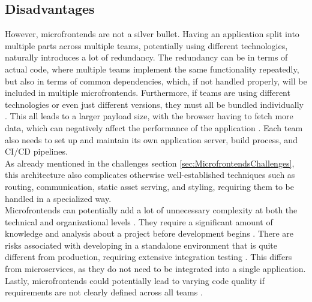 \subsection{Disadvantages}
However, microfrontends are not a silver bullet. Having an application split into multiple parts across multiple teams, potentially using different technologies, naturally introduces a lot of redundancy. The redundancy can be in terms of actual code, where multiple teams implement the same functionality repeatedly, but also in terms of common dependencies, which, if not handled properly, will be included in multiple microfrontends. Furthermore, if teams are using different technologies or even just different versions, they must all be bundled individually \cite{Geers}\cite{Peltonen}. This all leads to a larger payload size, with the browser having to fetch more data, which can negatively affect the performance of the application \cite{Peltonen}\cite{Montelius}\cite{Jackson}. Each team also needs to set up and maintain its own application server, build process, and CI/CD pipelines. \\

\noindent
As already mentioned in the challenges section \ref{sec:MicrofrontendsChallenges}, this architecture also complicates otherwise well-established techniques such as routing, communication, static asset serving, and styling, requiring them to be handled in a specialized way. \\

\noindent
Microfrontends can potentially add a lot of unnecessary complexity at both the technical and organizational levels \cite{Peltonen}. They require a significant amount of knowledge and analysis about a project before development begins \cite{Montelius}\cite{Peltonen}. There are risks associated with developing in a standalone environment that is quite different from production, requiring extensive integration testing \cite{Jackson}\cite{Montelius}\cite{Peltonen}. This differs from microservices, as they do not need to be integrated into a single application. Lastly, microfrontends could potentially lead to varying code quality if requirements are not clearly defined across all teams \cite{Montelius}.
